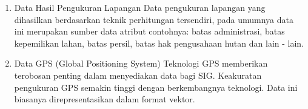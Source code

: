 \begin{enumerate}
\begin{enumerate}
\item Data Hasil Pengukuran Lapangan
\subitem  Data pengukuran lapangan yang dihasilkan berdasarkan teknik perhitungan tersendiri, pada umumnya data ini merupakan sumber data atribut contohnya: batas administrasi, batas kepemilikan lahan, batas persil, batas hak pengusahaan hutan dan lain - lain.

\item Data GPS (Global Positioning System)
\subitem Teknologi GPS memberikan terobosan penting dalam menyediakan data bagi SIG. Keakuratan pengukuran GPS semakin tinggi dengan berkembangnya teknologi. Data ini biasanya direpresentasikan dalam format vektor. 

\end{enumerate}
\end{enumerate}

